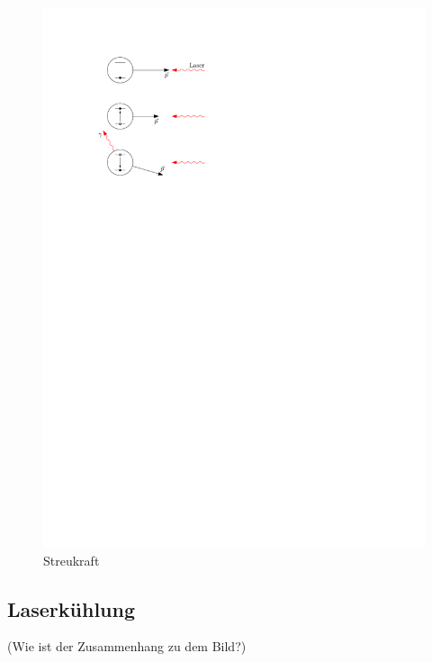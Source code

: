 \documentclass[11pt, a4paper]{article}
\numberwithin{equation}{section}
\newcommand{\korr}[1]{{\color{red}(#1)}}
\begin{document}
\begin{figure}
	\centering
	\includegraphics{./figures/theory/streukraft.pdf}
	\caption{Streukraft}
\end{figure}

\subsection{Laserkühlung}
\korr{Wie ist der Zusammenhang zu dem Bild?}
\end{document}
